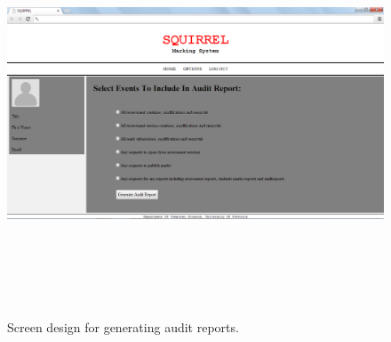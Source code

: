 \documentclass[12pt]{article}
\begin{document}
		\begin{figure}[htbp]
		\centering
		\includegraphics[width=1.0\linewidth, height=12cm]{./Diagrams/web_auditReport}
		\caption{Screen design for generating audit reports.}
		\label{fig:web_auditReport}
		\end{figure}
\end{document}

